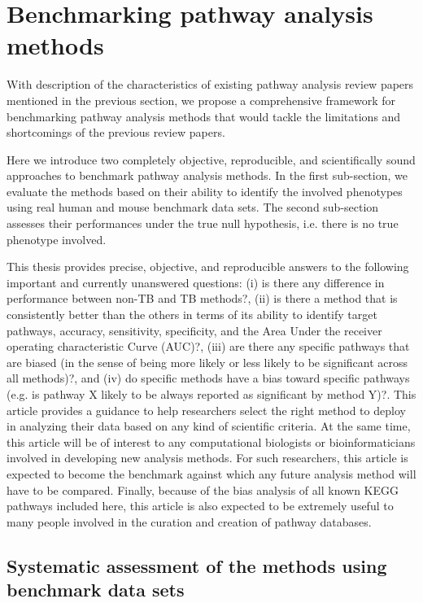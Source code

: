 \documentclass[Minh_PhD_thesis.tex]{subfiles}
\begin{document}
\section{Benchmarking pathway analysis methods}

With description of the characteristics of existing pathway analysis review papers mentioned in the previous section, we propose a comprehensive framework for benchmarking pathway analysis methods that would tackle the limitations and shortcomings of the previous review papers.

Here we introduce two completely objective, reproducible, and scientifically sound approaches to benchmark pathway analysis methods. In the first sub-section, we evaluate the methods based on their ability to identify the involved phenotypes using real human and mouse benchmark data sets. The second sub-section assesses their performances under the true null hypothesis, i.e. there is no true phenotype involved.


This thesis provides precise, objective, and reproducible answers to the following important and currently unanswered questions: (i) is there any difference in performance between non-TB and TB methods?, (ii) is there a method that is consistently better than the others in terms of its ability to identify target pathways, accuracy, sensitivity, specificity, and the Area Under the receiver operating characteristic Curve (AUC)?, (iii) are there any specific pathways that are biased (in the sense of being more likely or less likely to be significant across all methods)?, and (iv) do specific methods have a bias toward specific pathways (e.g. is pathway X likely to be always reported as significant by method Y)?. 
This article provides a guidance to help researchers select the right method to deploy in analyzing their data based on any kind of scientific criteria. 
At the same time, this article will be of interest to any computational biologists or bioinformaticians involved in developing new analysis methods. 
For such researchers, this article is expected to become the benchmark against which any future analysis method will have to be compared. 
Finally, because of the bias analysis of all known KEGG pathways included here, this article is also expected to be extremely useful to many people involved in the curation and creation of pathway databases.


\subsection{Systematic assessment of the methods using benchmark data sets}
\end{document}
